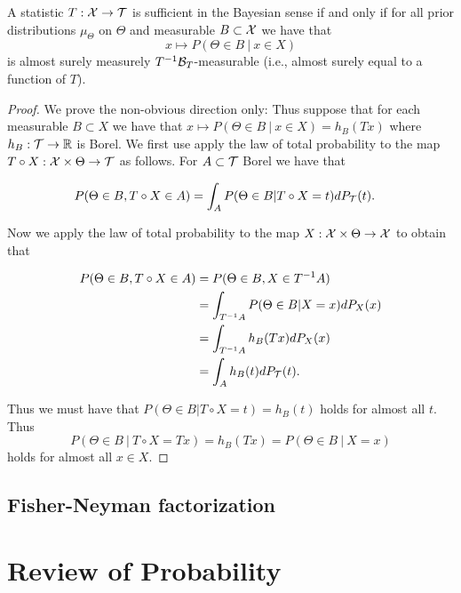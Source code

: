 \documentclass[twoside, a4paper, 10pt]{amsart}
\begin{document}
\begin{lemma} A statistic $T:\mathcal{X} \to \mathcal{T}$ is sufficient in the Bayesian sense if and only if for all prior distributions $\mu_{\Theta}$ on $\Theta$ and measurable $B \subset \mathcal{X}$ we have that $$x \mapsto P(\Theta \in B ~|~ x \in X)$$ is almost surely measurely $T^{-1}\mathcal{B}_T$-measurable (i.e., almost surely equal to a function of $T$).

\end{lemma}

\begin{proof} We prove the non-obvious direction only: Thus suppose that for each measurable $B \subset X$ we have that $x\mapsto P(\Theta \in B ~|~ x \in X) = h_B(Tx)$ where $h_B: \mathcal{T} \to \mathbb{R}$ is Borel. We first use apply the law of total probability to the map $T\circ X:\mathcal{X} \times \Theta \to \mathcal{T}$ as follows. For $A \subset \mathcal{T}$ Borel we have that

\begin{align*} P(\Theta \in B, T\circ X \in A) &= \int_{A} P(\Theta \in B| T\circ X = t) dP_{\mathcal{T}}(t).\end{align*} 

Now we apply the law of total probability to the map $X:\mathcal{X} \times \Theta \to \mathcal{X}$ to obtain that 

\begin{align*} P(\Theta \in B, T\circ X \in A) &= P(\Theta \in B , X \in T^{-1}A) \\
&= \int_{T^{-1}A} P(\Theta \in B | X = x)dP_X(x) \\ 
&= \int_{T^{-1}A} h_B(Tx) dP_X(x) \\
&= \int_A h_B(t) dP_{\mathcal{T}}(t).\end{align*} 

Thus we must have that $P(\Theta \in B | T \circ X = t) = h_B(t)$ holds for almost all $t$. Thus $$P(\Theta \in B ~|~ T \circ X = Tx) = h_B(Tx) = P(\Theta \in B ~|~ X = x)$$ holds for almost all $x \in X$. \end{proof}

\subsection{Fisher-Neyman factorization}

\appendix

\section{Review of Probability}
\end{document}
